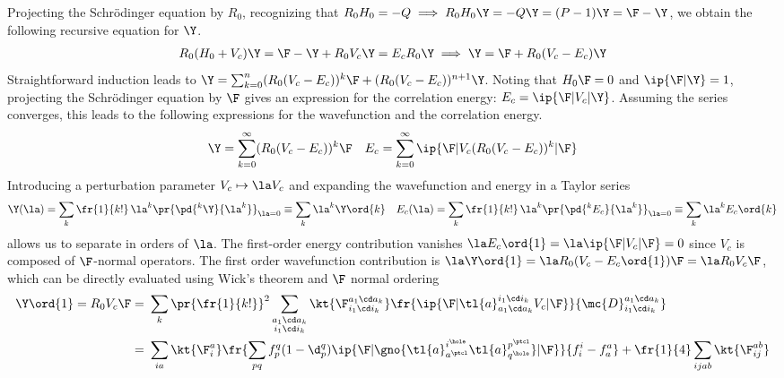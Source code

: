 \documentclass[11pt,fleqn]{article}
\numberwithin{equation}{section}
\begin{document}
\begin{dfn}
Projecting the Schr\"odinger equation by $R_0$, recognizing that
$R_0H_0=-Q\implies R_0H_0\Y=-Q\Y=(P-1)\Y=\F-\Y$,
we obtain the following recursive equation for $\Y$.
\begin{align*}
  R_0
  (H_0 + V_c)\Y
=
  \F
-
  \Y
+
  R_0V_c\Y
=
  E_cR_0\Y
\implies
  \Y
=
  \F
+
  R_0
  (V_c - E_c)
  \Y
\end{align*}
Straightforward induction leads to
$
  \Y
=
  \sum_{k=0}^n
  (R_0(V_c - E_c))^k\F
+
  (R_0(V_c - E_c))^{n+1}\Y
$.
Noting that $H_0\F=0$ and $\ip{\F|\Y}=1$, projecting the Schr\"odinger equation by $\F$ gives an expression for the correlation energy: $E_c=\ip{\F|V_c|\Y}$.
Assuming the series converges, this leads to the following expressions for the wavefunction and the correlation energy.
\begin{align}\label{eq:rspt-equations-form-1}
  \Y
=
  \sum_{k=0}^{\infty}
  (R_0(V_c - E_c))^k\F
&&
  E_c
=
  \sum_{k=0}^{\infty}
  \ip{\F|V_c(R_0(V_c - E_c))^k|\F}
\end{align}
Introducing a perturbation parameter $V_c\mapsto \la V_c$ and expanding the wavefunction and energy in a Taylor series
\begin{align*}
  \Y(\la)
=
  \sum_k
  \fr{1}{k!}\,\la^k\pr{\pd{^k\Y}{\la^k}}_{\la=0}
\equiv
  \sum_k
  \la^k \Y\ord{k}
&&
  E_c(\la)
=
  \sum_k
  \fr{1}{k!}\,\la^k\pr{\pd{^kE_c}{\la^k}}_{\la=0}
\equiv
  \sum_k
  \la^k
  E_c\ord{k}
\end{align*}
allows us to separate  in orders of $\la$.
The first-order energy contribution vanishes
$\la E_c\ord{1}=\la\ip{\F|V_c|\F}=0$
since $V_c$ is composed of $\F$-normal operators.
The first order wavefunction contribution is
$
  \la
  \Y\ord{1}
=
  \la
  R_0
  (V_c - E_c\ord{1})\F
=
  \la
  R_0
  V_c
  \F
$,
which can be directly evaluated using Wick's theorem and $\F$ normal ordering
\begin{align*}
  \Y\ord{1}
=
  R_0
  V_c
  \F
=&\
  \sum_k
  \pr{\fr{1}{k!}}^2
  \sum_{\substack{a_1\cd a_k\\i_1\cd i_k}}
  \kt{\F_{i_1\cd i_k}^{a_1\cd a_k}}
  \fr{
    \ip{\F|\tl{a}^{i_1\cd i_k}_{a_1\cd a_k}V_c|\F}
  }{
    \mc{D}_{i_1\cd i_k}^{a_1\cd a_k}
  }
\\=&\
  \sum_{ia}
  \kt{\F_i^a}
  \fr{
    \sum_{pq}
    f_p^q(1-\d_p^q)
    \ip{\F|\gno{\tl{a}_{a^\ptcl}^{i^\hole}\tl{a}^{p^\ptcl}_{q^\hole}}|\F}
  }{
    f_i^i
  -
    f_a^a
  }
+
  \fr{1}{4}
  \sum_{ijab}
  \kt{\F_{ij}^{ab}}

\end{align*}
\end{dfn}
\end{document}
